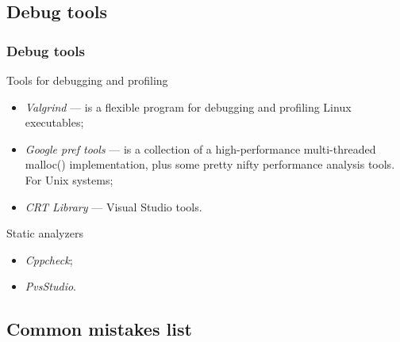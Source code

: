 \documentclass{bredelebeamer}
\begin{document}
\subsection{Debug tools}
\begin{frame}[fragile]
	\frametitle{Debug tools}
	\begin{exampleblock}{Tools for debugging and profiling}
	\begin{itemize}
		\item \emph{Valgrind} --- is a flexible program for debugging and profiling Linux executables;
		\item \emph{Google pref tools} --- is a collection of a high-performance multi-threaded malloc()
			implementation, plus some pretty nifty performance analysis tools. For Unix systems;
		\item \emph{CRT Library} --- Visual Studio tools.
	\end{itemize}
	\end{exampleblock}

	\begin{exampleblock}{Static analyzers}
	\begin{itemize}
		\item \emph{Cppcheck};
		\item \emph{PvsStudio}.
	\end{itemize}
	\end{exampleblock}
\end{frame}

\subsection{Common mistakes list}
\end{document}
